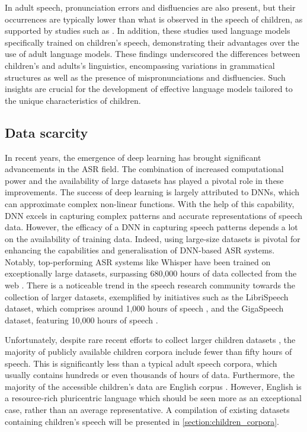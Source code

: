 In adult speech, pronunciation errors and disfluencies are also present, but their occurrences are typically lower than what is observed in the speech of children, as supported by studies such as \cite{Children_language_model,children_language_model2}. In addition, these studies used language models specifically trained on children's speech, demonstrating their advantages over the use of adult language models. These findings underscored the differences between children's and adults's linguistics, encompassing variations in grammatical structures as well as the presence of mispronunciations and disfluencies. Such insights are crucial for the development of effective language models tailored to the unique characteristics of children.


\subsection{Data scarcity}%
\label{section:data_scarcity}
In recent years, the emergence of deep learning has brought significant advancements in the \ac{ASR} field. The combination of increased computational power and the availability of large datasets has played a pivotal role in these improvements. The success of deep learning is largely attributed to \ac{DNN}s, which can approximate complex non-linear functions. With the help of this capability, \ac{DNN} excels in capturing complex patterns and accurate representations of speech data. However, the efficacy of a \ac{DNN} in capturing speech patterns depends a lot on the availability of training data. Indeed, using large-size datasets is pivotal for enhancing the capabilities and generalisation of \ac{DNN}-based \ac{ASR} systems. Notably, top-performing \ac{ASR} systems like Whisper have been trained on exceptionally large datasets, surpassing 680,000 hours of data collected from the web \cite{radford2023robust}. There is a noticeable trend in the speech research community towards the collection of larger datasets, exemplified by initiatives such as the LibriSpeech dataset, which comprises around 1,000 hours of speech \cite{librispeech}, and the GigaSpeech dataset, featuring 10,000 hours of speech \cite{chen2021gigaspeech}.

Unfortunately, despite rare recent efforts to collect larger children datasets \cite{MyST,singakids,ahmed2021auskidtalk}, the majority of publicly available children corpora include fewer than fifty hours of speech. This is significantly less than a typical adult speech corpora, which usually contains hundreds or even thousands of hours of data. Furthermore, the majority of the accessible children's data are English corpus \cite{MyST,cmu,cslu,pf-star-british,ahmed2021auskidtalk}. However, English is a resource-rich pluricentric language which should be seen more as an exceptional case, rather than an average representative. A compilation of existing datasets containing children's speech will be presented in \ref{section:children_corpora}.

